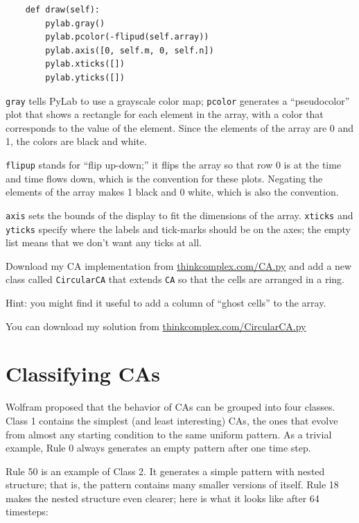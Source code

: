 \documentclass[10pt]{book}
\begin{document}
\begin{verbatim}
    def draw(self):
        pylab.gray()
        pylab.pcolor(-flipud(self.array))
        pylab.axis([0, self.m, 0, self.n])
        pylab.xticks([])
        pylab.yticks([])
\end{verbatim}

{\tt gray} tells PyLab to use a grayscale color map;
{\tt pcolor} generates a ``pseudocolor'' plot that shows a
rectangle for each element in the array, with a color that
corresponds to the value of the element.  Since the elements
of the array are 0 and 1, the colors are black and white.

{\tt flipup} stands for ``flip up-down;'' it flips the array
so that row 0 is at the time and time flows down, which is the
convention for these plots.  Negating the elements of the array
makes 1 black and 0 white, which is also the convention.

{\tt axis} sets the bounds of the display to fit the dimensions of
the array.  {\tt xticks} and {\tt yticks} specify where the
labels and tick-marks should be on the axes; the empty list means
that we don't want any ticks at all.


\begin{ex}

Download my CA implementation from
\url{thinkcomplex.com/CA.py}
and add a new class called {\tt CircularCA} that extends
{\tt CA} so that the cells are arranged in a ring.

Hint: you might find it useful to add a column of ``ghost cells'' to
the array.

You can download my solution from 
\url{thinkcomplex.com/CircularCA.py}

\end{ex}


\section{Classifying CAs}

Wolfram proposed that the behavior of CAs can be grouped
into four classes.  Class 1 contains the simplest (and least
interesting) CAs, the ones that evolve from almost any starting
condition to the same uniform pattern.  As a trivial example,
Rule 0 always generates an empty pattern after one time step.

Rule 50 is an example of Class 2.  It generates a simple pattern with
nested structure; that is, the pattern contains many smaller versions
of itself.  Rule 18 makes the nested structure even clearer; here is
what it looks like after 64 timesteps:
\end{document}
